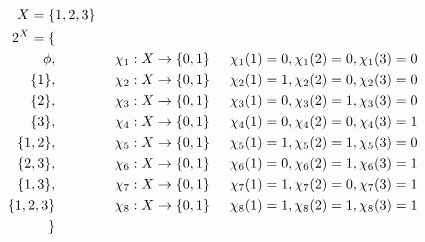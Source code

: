 \documentclass{beamer}
\begin{document}
\begin{CJK*}{UTF8}{gbsn}
\begin{frame}
  \begin{align*}
    X=\{&1,2,3\}\\
    2^X=\{&\\
        \phi,&\hspace{1.5cm}\chi_1:X\to \{0,1\}\hspace{0.5cm} \chi_1(1)=0,\chi_1(2)=0,\chi_1(3)=0\\
    \{1\},&\hspace{1.5cm}\chi_2:X\to \{0,1\}\hspace{0.5cm} \chi_2(1)=1,\chi_2(2)=0,\chi_2(3)=0\\
        \{2\},&\hspace{1.5cm}\chi_3:X\to \{0,1\}\hspace{0.5cm} \chi_3(1)=0,\chi_3(2)=1,\chi_3(3)=0\\
    \{3\},&\hspace{1.5cm}\chi_4:X\to \{0,1\}\hspace{0.5cm} \chi_4(1)=0,\chi_4(2)=0,\chi_4(3)=1\\
    \{1,2\},&\hspace{1.5cm}\chi_5:X\to \{0,1\}\hspace{0.5cm} \chi_5(1)=1,\chi_5(2)=1,\chi_5(3)=0\\
    \{2,3\},&\hspace{1.5cm}\chi_6:X\to \{0,1\}\hspace{0.5cm} \chi_6(1)=0,\chi_6(2)=1,\chi_6(3)=1\\
    \{1,3\},&\hspace{1.5cm}\chi_7:X\to \{0,1\}\hspace{0.5cm} \chi_7(1)=1,\chi_7(2)=0,\chi_7(3)=1\\
    \{1,2,3\}&\hspace{1.5cm}\chi_8:X\to \{0,1\}\hspace{0.5cm} \chi_8(1)=1,\chi_8(2)=1,\chi_8(3)=1\\
    \}\\
  \end{align*}
\end{frame}
\end{CJK*}
\end{document}
